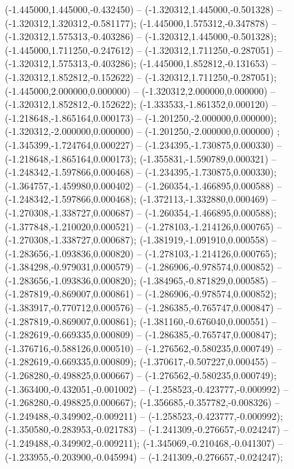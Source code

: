  (-1.445000,1.445000,-0.432450) -- (-1.320312,1.445000,-0.501328) -- (-1.320312,1.320312,-0.581177);
 (-1.445000,1.575312,-0.347878) -- (-1.320312,1.575313,-0.403286) -- (-1.320312,1.445000,-0.501328);
 (-1.445000,1.711250,-0.247612) -- (-1.320312,1.711250,-0.287051) -- (-1.320312,1.575313,-0.403286);
 (-1.445000,1.852812,-0.131653) -- (-1.320312,1.852812,-0.152622) -- (-1.320312,1.711250,-0.287051);
 (-1.445000,2.000000,0.000000) -- (-1.320312,2.000000,0.000000) -- (-1.320312,1.852812,-0.152622);
 (-1.333533,-1.861352,0.000120) -- (-1.218648,-1.865164,0.000173) -- (-1.201250,-2.000000,0.000000);
 (-1.320312,-2.000000,0.000000) -- (-1.201250,-2.000000,0.000000) ;
 (-1.345399,-1.724764,0.000227) -- (-1.234395,-1.730875,0.000330) -- (-1.218648,-1.865164,0.000173);
 (-1.355831,-1.590789,0.000321) -- (-1.248342,-1.597866,0.000468) -- (-1.234395,-1.730875,0.000330);
 (-1.364757,-1.459980,0.000402) -- (-1.260354,-1.466895,0.000588) -- (-1.248342,-1.597866,0.000468);
 (-1.372113,-1.332880,0.000469) -- (-1.270308,-1.338727,0.000687) -- (-1.260354,-1.466895,0.000588);
 (-1.377848,-1.210020,0.000521) -- (-1.278103,-1.214126,0.000765) -- (-1.270308,-1.338727,0.000687);
 (-1.381919,-1.091910,0.000558) -- (-1.283656,-1.093836,0.000820) -- (-1.278103,-1.214126,0.000765);
 (-1.384298,-0.979031,0.000579) -- (-1.286906,-0.978574,0.000852) -- (-1.283656,-1.093836,0.000820);
 (-1.384965,-0.871829,0.000585) -- (-1.287819,-0.869007,0.000861) -- (-1.286906,-0.978574,0.000852);
 (-1.383917,-0.770712,0.000576) -- (-1.286385,-0.765747,0.000847) -- (-1.287819,-0.869007,0.000861);
 (-1.381160,-0.676040,0.000551) -- (-1.282619,-0.669335,0.000809) -- (-1.286385,-0.765747,0.000847);
 (-1.376716,-0.588126,0.000510) -- (-1.276562,-0.580235,0.000749) -- (-1.282619,-0.669335,0.000809);
 (-1.370617,-0.507227,0.000455) -- (-1.268280,-0.498825,0.000667) -- (-1.276562,-0.580235,0.000749);
 (-1.363400,-0.432051,-0.001002) -- (-1.258523,-0.423777,-0.000992) -- (-1.268280,-0.498825,0.000667);
 (-1.356685,-0.357782,-0.008326) -- (-1.249488,-0.349902,-0.009211) -- (-1.258523,-0.423777,-0.000992);
 (-1.350580,-0.283953,-0.021783) -- (-1.241309,-0.276657,-0.024247) -- (-1.249488,-0.349902,-0.009211);
 (-1.345069,-0.210468,-0.041307) -- (-1.233955,-0.203900,-0.045994) -- (-1.241309,-0.276657,-0.024247);
